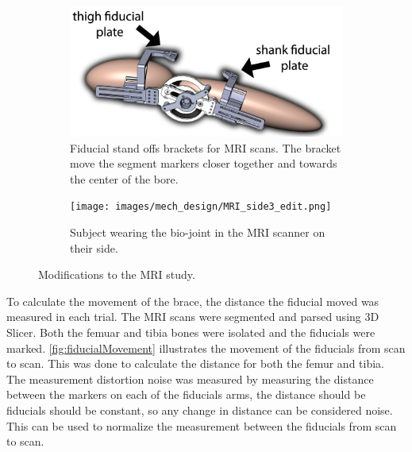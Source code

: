 \begin{figure}[ht!]
    \begin{subfigure}{\textwidth}
        \centering
        \includegraphics[width=0.75\linewidth]{images/mech_design/mri_knee_with_markers_edit.png}
          \captionsetup{justification=centering}
        \caption[fiducial stand off]{Fiducial stand offs brackets for MRI scans. The bracket move the segment markers closer together and towards the center of the bore.}
        \label{fig:MRIMarkerStandoff}
    \end{subfigure}
    \begin{subfigure}{\textwidth}
        \centering
        \texttt{[image: images/mech\_design/MRI\_side3\_edit.png]}
          \captionsetup{justification=centering}
        \caption[MRI Subject on Side]{Subject wearing the bio-joint in the MRI scanner on their side.}
        \label{fig:wearingMRIBIOJointSide}
    \end{subfigure}
    \caption[MRI scan Fixes]{Modifications to the MRI study.}
    \label{fig:MRIFixes}
\end{figure}

To calculate the movement of the brace, the distance the fiducial moved was measured in each trial. The MRI scans were segmented and parsed using 3D Slicer\cite{fedorov20123d}. Both the femuar and tibia bones were isolated and the fiducials were marked. \autoref{fig:fiducialMovement} illustrates the movement of the fiducials from scan to scan. This was done to calculate the distance for both the femur and tibia. The measurement distortion noise was measured by measuring the distance between the markers on each of the fiducials arms, the distance should be fiducials should be constant, so any change in distance can be considered noise. This can be used to normalize the measurement between the fiducials from scan to scan. 


